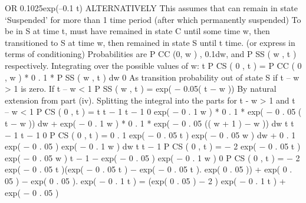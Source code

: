 \documentclass[a4paper,12pt]{article}
\begin{document}
OR
0.1025exp(–0.1 t)
ALTERNATIVELY
This assumes that can remain in state ‘Suspended’ for more than 1 time period (after which permanently suspended)
To be in S at time t, must have remained in state C until some time w, then transitioned to S at time w, then remained in state S until t time.
(or express in terms of conditioning)
Probabilities are P CC (0, w ) , 0.1dw, and P SS ( w , t ) respectively.
Integrating over the possible values of w:
t
P CS ( 0 , t ) = \int P CC ( 0 , w ) * 0 . 1 * P SS ( w , t ) dw
0
As transition probability out of state S if t – w > 1 is zero.
If t – w < 1
P SS ( w , t ) = exp( − 0.05( t − w ))
By natural extension from part (iv).
Splitting the integral into the parts for t - w > 1 and t – w < 1
P CS ( 0 , t ) =
t t − 1
t − 1 0
\int exp( − 0 . 1 w ) * 0 . 1 * exp( − 0 . 05 ( t − w )) dw + \int exp( − 0 . 1 w ) * 0 . 1 * exp( − 0 . 05 (( w + 1 ) − w )) dw
t t − 1
t − 1 0
P CS ( 0 , t ) = 0 . 1 exp( − 0 . 05 t ) \int exp( − 0 . 05 w ) dw + 0 . 1 exp( − 0 . 05 ) \int exp( − 0 . 1 w ) dw
t
t − 1
P CS ( 0 , t ) = − 2 exp( − 0 . 05 t ) exp( − 0 . 05 w ) t − 1 − exp( − 0 . 05 ) exp( − 0 . 1 w ) 0
P CS ( 0 , t ) = − 2 exp( − 0 . 05 t )(exp( − 0 . 05 t ) − exp( − 0 . 05 t ). exp( 0 . 05 )) + exp( 0 . 05 ) − exp( 0 . 05 ). exp( − 0 . 1 t )
= (exp( 0 . 05 ) − 2 ) exp( − 0 . 1 t ) + exp( − 0 . 05 )

\end{document}
